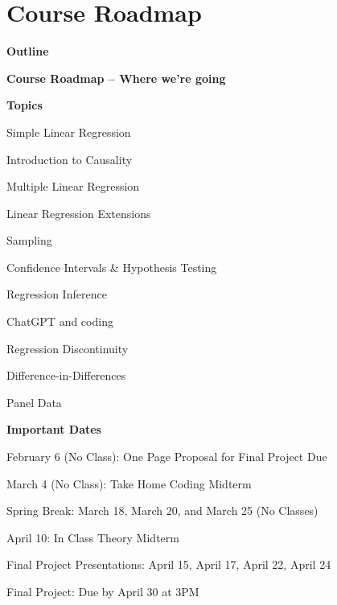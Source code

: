 \documentclass[11pt, aspectratio=169]{beamer}
\newenvironment{wideitemize}{\itemize\addtolength{\itemsep}{5pt}}{\enditemize}
\newenvironment{wideenumerate}{\enumerate\addtolength{\itemsep}{5pt}}{\endenumerate}
\begin{document}
\section{Course Roadmap}
	\begin{frame}{\bf \large Outline}
	\tableofcontents[currentsection]
\end{frame}
\begin{frame}{\bf \large Course Roadmap -- Where we're going}

\begin{minipage}{.5\textwidth}
\begin{wideitemize}
	\item \textbf{Topics}
	\begin{wideenumerate}
		\item Simple Linear Regression 
		\item Introduction to Causality
		\item Multiple Linear Regression
		\item Linear Regression Extensions
		\item Sampling
		\item Confidence Intervals \& Hypothesis Testing
		\item Regression Inference
		\item ChatGPT and coding
		\item Regression Discontinuity
		\item Difference-in-Differences
		\item Panel Data
	\end{wideenumerate}
\end{wideitemize}
\end{minipage}\pause%
\begin{minipage}{.5\textwidth}
	\begin{wideitemize}
		\item \textbf{Important Dates}
		\begin{wideitemize}
			\item February 6 (No Class): One Page Proposal for Final Project Due			 
			\item March 4 (No Class): Take Home Coding Midterm
			\item Spring Break: March 18, March 20, and March 25 (No Classes)
			\item April 10: In Class Theory Midterm
			\item Final Project Presentations: April 15, April 17, April 22, April 24
			\item Final Project: Due by April 30 at 3PM
		\end{wideitemize}
	\end{wideitemize}
\end{minipage}
\end{frame}
\end{document}
